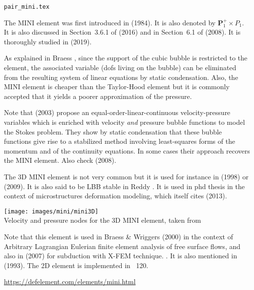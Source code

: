 \begin{flushright} {\tiny {\color{gray} \tt pair\_mini.tex}} \end{flushright}

\noindent
\begin{minipage}{0.48\textwidth}
The  MINI element was first introduced in 
\textcite{arbf84} (1984). It is also denoted by ${\bm P}_1^+\times P_1$.
It is also discussed in Section~3.6.1 of \textcite{john16} (2016) and in Section~6.1 
of \textcite{bobf08} (2008). It is thoroughly studied in \textcite{cibo19} (2019).

As explained in Braess \cite{braess}, since the support of the cubic bubble is restricted to the element, 
the associated variable (dofs living on the bubble) can be eliminated from the resulting 
system of linear equations by static condensation. 
Also, the MINI element is cheaper than the Taylor-Hood element but it is commonly accepted
that it yields a poorer approximation of the pressure.
\end{minipage}\hfill
\begin{minipage}{0.48\textwidth}

\end{minipage}

\begin{remark}
Note that \textcite{frol03} (2003) propose an equal-order-linear-continuous 
velocity-pressure variables which is enriched 
with velocity {\it and} pressure bubble functions to model the Stokes problem. 
They show by static condensation that
these bubble functions give rise to a stabilized method involving least-squares forms of 
the momentum and of the
continuity equations. In some cases their approach recovers 
the MINI element. Also check \textcite{gamt08} (2008).
\end{remark}

The 3D MINI element is not very common but it is used for instance in \textcite{pico98} (1998) or
\textcite{tokv09} (2009). 
It is also said to be LBB stable in Reddy \cite[p180]{reddybook2}.
It is used in \cite{furstoss} phd thesis in the context of microstructures deformation modeling, 
which itself cites \textcite{camb13} (2013).

\begin{center}
\texttt{[image: images/mini/mini3D]}\\
{\captionfont Velocity and pressure nodes for the 3D MINI element, taken from \cite{pico98}}
\end{center}

Note that this element is used in Braess \& Wriggers (2000) \cite{brwr00} 
in the context of Arbitrary Lagrangian Eulerian 
finite element analysis of free surface flows, and also 
in \textcite{zldf07} (2007) for subduction with X-FEM technique. 
. It is also mentioned in \textcite{nath93} (1993).
The 2D element is implemented in \stone~120.

\begin{center}
\url{https://defelement.com/elements/mini.html}
\end{center}
